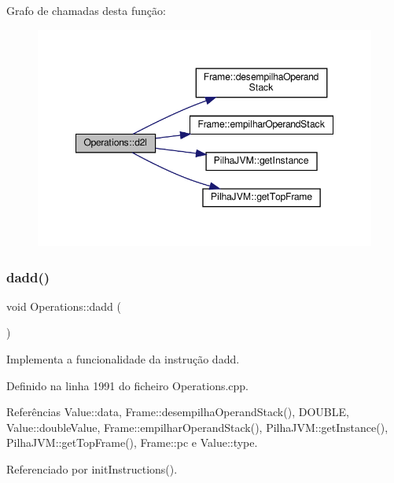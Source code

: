 Grafo de chamadas desta função\+:
\nopagebreak
\begin{figure}[H]
\begin{center}
\leavevmode
\includegraphics[width=348pt]{classOperations_a2babf3c9e2ac30a70a07f8d43b32440a_cgraph}
\end{center}
\end{figure}
\mbox{\label{classOperations_a8a23241bed8c033ab75994a18bf2a702}} 
\subsubsection{\texorpdfstring{dadd()}{dadd()}}
{\footnotesize\ttfamily void Operations\+::dadd (\begin{DoxyParamCaption}{ }\end{DoxyParamCaption})\hspace{0.3cm}{\ttfamily [private]}}



Implementa a funcionalidade da instrução dadd. 



Definido na linha 1991 do ficheiro Operations.\+cpp.



Referências Value\+::data, Frame\+::desempilha\+Operand\+Stack(), D\+O\+U\+B\+LE, Value\+::double\+Value, Frame\+::empilhar\+Operand\+Stack(), Pilha\+J\+V\+M\+::get\+Instance(), Pilha\+J\+V\+M\+::get\+Top\+Frame(), Frame\+::pc e Value\+::type.



Referenciado por init\+Instructions().

